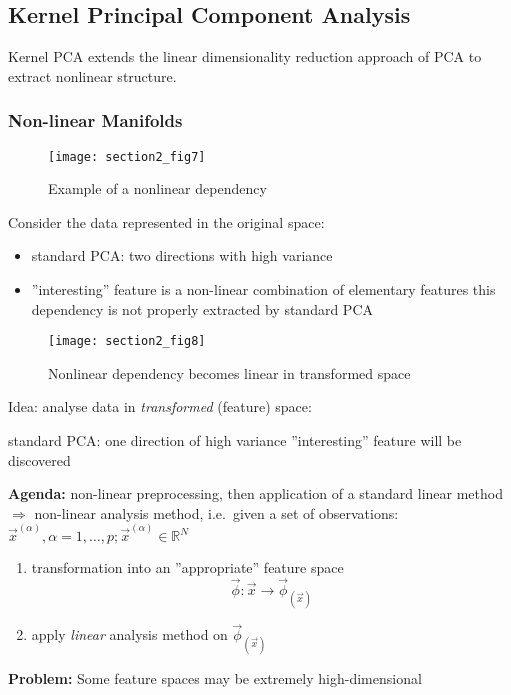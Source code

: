 
\newpage 						%
\subsection{Kernel Principal Component Analysis}
Kernel PCA extends the linear dimensionality reduction approach of PCA to extract nonlinear structure. 
\subsubsection{Non-linear Manifolds}
\begin{figure}[h]
  \centering
\texttt{[image: section2\_fig7]}  
  \caption{Example of a nonlinear dependency}
  \label{fig:nonlinearDependency}
\end{figure}
%
Consider the data represented in the original space:
\begin{itemize}
  \item standard PCA: two directions with high variance
  \item ''interesting'' feature is a non-linear combination of
    elementary features \itl this dependency is not properly extracted
    by standard PCA
\end{itemize}

\begin{figure}[h]
  \centering
\texttt{[image: section2\_fig8]}  
  \caption{Nonlinear dependency becomes linear in transformed space}
  \label{fig:transformedDependency}
\end{figure}


Idea: analyse data in \emph{transformed} (feature) space:
\begin{itemize}
	\itl standard PCA: one direction of high variance
	\itl ''interesting'' feature will be discovered
\end{itemize}
\textbf{Agenda:} non-linear preprocessing, then application of a
standard linear method $\Rightarrow$ non-linear analysis method,
i.e.\ given a set of observations: $\vec{x}^{(\alpha)}, \alpha = 1,
\ldots, p; \vec{x}^{(\alpha)} \in \mathbb{R}^N$
\begin{enumerate}[(1)]
\item transformation into an ''appropriate'' feature space
\begin{equation}
	\vec{\phi}: \vec{x} \rightarrow \vec{\phi}_{(\vec{x})}
\end{equation}
\item apply \emph{linear} analysis method on $\vec{\phi}_{(\vec{x})}$
\end{enumerate}
\textbf{Problem:} Some feature spaces may be extremely high-dimensional

